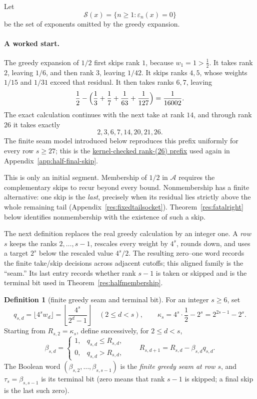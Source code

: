 \documentclass[11pt]{article}
\newcommand{\commit}{ebc98ee71f6819bd9fe344a0bb343542c604e533}
\newcommand{\repobase}{https://github.com/wcook04/plectis-lean-erdos249-257/blob/\commit}
\newcommand{\PK}{Erdos249257}
\newcommand{\lword}[4]{\href{\repobase/\PK/#1\#L#2}{#4}}
\theoremstyle{definition}
\newtheorem{definition}[theorem]{Definition}
\theoremstyle{remark}
\begin{document}
Let
\[
 \mathcal S(x)=\{n\geq1:\varepsilon_n(x)=0\}
\]
be the set of exponents omitted by the greedy expansion.

\paragraph{A worked start.}
The greedy expansion of \(1/2\) first skips rank \(1\), because
\(w_1=1>\tfrac12\).  It takes rank \(2\), leaving \(1/6\), and then rank
\(3\), leaving \(1/42\).  It skips ranks \(4,5\), whose weights \(1/15\)
and \(1/31\) exceed that residual.  It then takes ranks \(6,7\), leaving
\[
 \frac12-\Bigl(\frac13+\frac17+\frac1{63}+\frac1{127}\Bigr)
 =\frac1{16002}.
\]
The exact calculation continues with the next take at rank \(14\), and through
rank \(26\) it takes exactly
\[
 2,3,6,7,14,20,21,26.
\]
The finite seam model introduced below reproduces this prefix uniformly for
every row \(s\geq27\); this is the
\lword{HalfFinalMiddlePhaseSieve.lean}{1190}{seamGreedyBits_head2367_14_20_21_26}{kernel-checked rank-(26) prefix}
used again in Appendix~\ref{app:half-final-skip}.

This is only an initial segment.  Membership of \(1/2\) in \(\mathcal A\)
requires the complementary skips to recur beyond every bound.  Nonmembership
has a finite alternative: one skip is the \emph{last}, precisely when its
residual lies strictly above the whole remaining tail
(Appendix~\ref{res:fixedtailsocket}).  Theorem~\ref{res:fatalright} below
identifies nonmembership with the existence of such a skip.

The next definition replaces the real greedy calculation by an integer one.
A \emph{row} \(s\) keeps the ranks \(2,\ldots,s-1\), rescales every weight by
\(4^s\), rounds down, and uses a target \(2^s\) below the rescaled value
\(4^s/2\).  The resulting zero--one word records the finite take/skip
decisions across adjacent cutoffs; this aligned family is the ``seam.''  Its
last entry records whether rank \(s-1\) is taken or skipped and is the terminal
bit used in Theorem~\ref{res:halfmembership}.

\begin{definition}[finite greedy seam and terminal bit]\label{def:terminal-bit}
For an integer \(s\geq6\), set
\[
 q_{s,d}=\lfloor4^sw_d\rfloor
 =\left\lfloor\frac{4^s}{2^d-1}\right\rfloor
 \quad(2\leq d<s),
 \qquad
 \kappa_s=4^s\cdot\frac12-2^s=2^{2s-1}-2^s.
\]
Starting from \(R_{s,2}=\kappa_s\), define successively, for \(2\leq d<s\),
\[
 \beta_{s,d}=
 \begin{cases}
  1,&q_{s,d}\leq R_{s,d},\\
  0,&q_{s,d}>R_{s,d},
 \end{cases}
 \qquad
 R_{s,d+1}=R_{s,d}-\beta_{s,d}q_{s,d}.
\]
The Boolean word \((\beta_{s,2},\ldots,\beta_{s,s-1})\) is the
\emph{finite greedy seam at row \(s\)}, and
\(\tau_s=\beta_{s,s-1}\) is its terminal bit (zero means that rank \(s-1\)
is skipped; a final skip is the last such zero).
\end{definition}
\end{document}
